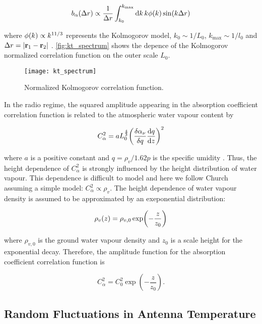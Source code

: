\begin{equation}
        b_\alpha\qty(\Delta r) \propto \frac{1}{\Delta r}
        \int^{k_\text{max}}_{k_0} \dd{k} k \phi\qty(k) \sin(k\Delta r)
\end{equation}

where $\phi\qty(k) \propto k^{11/3}$ represents the Kolmogorov model, $k_0
\sim 1/L_0$, $k_\text{max} \sim 1/l_0$ and $\Delta r = \abs{\vb{r}_1 -
\vb{r}_2}$ \autocite{tatarski2016wave}. \autoref{fig:kt_spectrum} shows the
depence of the Kolmogorov normalized correlation function on the outer
scale $L_0$.

\begin{figure}
        \centering
        \texttt{[image: kt\_spectrum]}
        \caption{Normalized Kolmogorov correlation function.}
        \label{fig:kt_spectrum}
\end{figure}

In the radio regime, the squared amplitude appearing in the absorption
coefficient correlation function is related to the atmospheric water vapour
content by

\begin{equation}
        C^2_\alpha = a L^\frac{4}{3}_0 \qty(\fdv{\alpha_\nu}{q}
        \dv{q}{z})^2
\end{equation}

where $a$ is a positive constant and $q = \rho_v/1.62p$ is the specific umidity
\autocite{tatarski2016wave}.  Thus, the height dependence of $C^2_\alpha$
is strongly influenced by the height distribution of water vapour. This
dependence is difficult to model and here we follow Church assuming a
simple model: $C^2_\alpha \propto \rho_v$. The height
dependence of water vapour density is assumed to be approximated by an
exeponential distribution:

\begin{equation}
        \rho_v\qty(z) = \rho_{v,0} \exp(-\frac{z}{z_0})
\end{equation}

where $\rho_{v,0}$ is the ground water vapour density and $z_0$ is a scale
height for the exponential decay. Therefore, the amplitude function for the
absorption coefficient correlation function is

\begin{equation}
        C^2_\alpha = C^2_0\exp(-\frac{z}{z_0}).
\end{equation}

\subsection{Random Fluctuations in Antenna Temperature}

